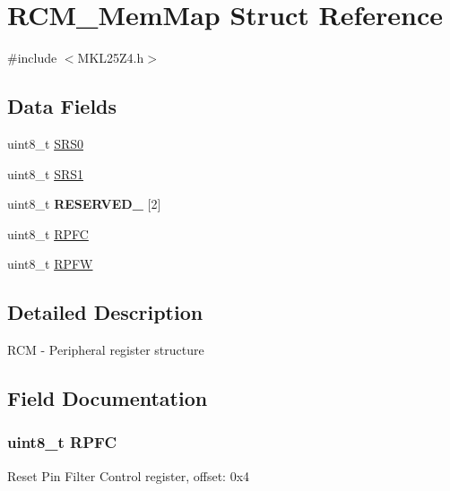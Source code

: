 \hypertarget{struct_r_c_m___mem_map}{}\section{R\+C\+M\+\_\+\+Mem\+Map Struct Reference}
\label{struct_r_c_m___mem_map}


{\ttfamily \#include $<$M\+K\+L25\+Z4.\+h$>$}

\subsection*{Data Fields}
\begin{DoxyCompactItemize}
\item 
uint8\+\_\+t \hyperlink{struct_r_c_m___mem_map_a72cc435004865ba66a0ca44630f10fd3}{S\+R\+S0}
\item 
uint8\+\_\+t \hyperlink{struct_r_c_m___mem_map_a17104acf49b7e08ee75c675987528f92}{S\+R\+S1}
\item 
\hypertarget{struct_r_c_m___mem_map_a1d386ff4b328960f430b4c63f61423fa}{}uint8\+\_\+t {\bfseries R\+E\+S\+E\+R\+V\+E\+D\+\_} \mbox{[}2\mbox{]}\label{struct_r_c_m___mem_map_a1d386ff4b328960f430b4c63f61423fa}

\item 
uint8\+\_\+t \hyperlink{struct_r_c_m___mem_map_afbe59a267584c8d35fe61a861e753155}{R\+P\+F\+C}
\item 
uint8\+\_\+t \hyperlink{struct_r_c_m___mem_map_a8c3111caa4359258a32cb7db2b456445}{R\+P\+F\+W}
\end{DoxyCompactItemize}


\subsection{Detailed Description}
R\+C\+M -\/ Peripheral register structure 

\subsection{Field Documentation}
\hypertarget{struct_r_c_m___mem_map_afbe59a267584c8d35fe61a861e753155}{}
\subsubsection[{R\+P\+F\+C}]{\setlength{\rightskip}{0pt plus 5cm}uint8\+\_\+t R\+P\+F\+C}\label{struct_r_c_m___mem_map_afbe59a267584c8d35fe61a861e753155}
Reset Pin Filter Control register, offset\+: 0x4 \hypertarget{struct_r_c_m___mem_map_a8c3111caa4359258a32cb7db2b456445}{}

